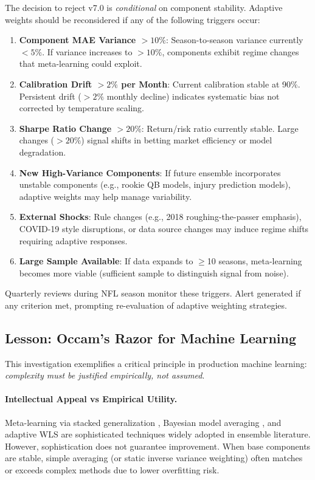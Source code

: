 The decision to reject v7.0 is \textit{conditional} on component stability. Adaptive weights should be reconsidered if any of the following triggers occur:

\begin{enumerate}
  \item \textbf{Component MAE Variance $>10\%$}: Season-to-season variance currently $<5\%$. If variance increases to $>10\%$, components exhibit regime changes that meta-learning could exploit.

  \item \textbf{Calibration Drift $>2\%$ per Month}: Current calibration stable at 90\%. Persistent drift ($>2\%$ monthly decline) indicates systematic bias not corrected by temperature scaling.

  \item \textbf{Sharpe Ratio Change $>20\%$}: Return/risk ratio currently stable. Large changes ($>20\%$) signal shifts in betting market efficiency or model degradation.

  \item \textbf{New High-Variance Components}: If future ensemble incorporates unstable components (e.g., rookie QB models, injury prediction models), adaptive weights may help manage variability.

  \item \textbf{External Shocks}: Rule changes (e.g., 2018 roughing-the-passer emphasis), COVID-19 style disruptions, or data source changes may induce regime shifts requiring adaptive responses.

  \item \textbf{Large Sample Available}: If data expands to $\ge$10 seasons, meta-learning becomes more viable (sufficient sample to distinguish signal from noise).
\end{enumerate}

Quarterly reviews during NFL season monitor these triggers. Alert generated if any criterion met, prompting re-evaluation of adaptive weighting strategies.

\subsection{Lesson: Occam's Razor for Machine Learning}

This investigation exemplifies a critical principle in production machine learning: \textit{complexity must be justified empirically, not assumed}.

\paragraph{Intellectual Appeal vs Empirical Utility.}
Meta-learning via stacked generalization \citep{wolpert1992stacked}, Bayesian model averaging \citep{hoeting1999bayesian}, and adaptive WLS \citep{cleveland1979robust} are sophisticated techniques widely adopted in ensemble literature. However, sophistication does not guarantee improvement. When base components are stable, simple averaging (or static inverse variance weighting) often matches or exceeds complex methods due to lower overfitting risk.

